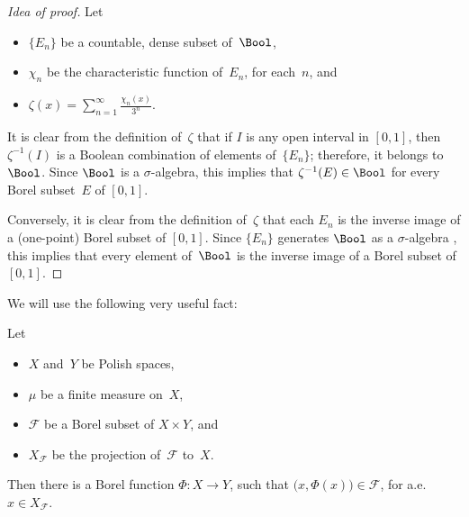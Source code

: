 \begin{proof}[Idea of proof]
Let 
	\begin{itemize}
	\item $\{E_n\}$ be a countable, dense subset of~$\Bool$,
	\item $\chi_n$ be the characteristic function of~$E_n$, for each~$n$,
	and
	\item $\displaystyle \zeta(x) = \sum_{n = 1}^\infty \frac{\chi_n(x)}{3^n}$.
	\end{itemize}

It is clear from the definition of~$\zeta$ that if $I$ is any open interval in $[0,1]$, then $\zeta^{-1}(I)$ is a Boolean combination of elements of~$\{E_n\}$; therefore, it belongs to~$\Bool$. Since $\Bool$ is a $\sigma$-algebra, this implies that $\zeta^{-1}(E) \in \Bool$ for every Borel subset~$E$ of $[0,1]$.

Conversely, it is clear from the definition of~$\zeta$ that each $E_n$ is the inverse image of a (one-point) Borel subset of $[0,1]$. Since $\{E_n\}$ generates $\Bool$ as a $\sigma$-algebra , this implies that every element of~$\Bool$ is the inverse image of a Borel subset of $[0,1]$.
\end{proof}

We will use the following very useful fact:

\begin{thm} \label{vonNeumannSelectionThm}
  Let
  \begin{itemize}
  \item $X$ and~$Y$ be Polish spaces,
  \item $\mu$ be a finite measure on~$X$,
  \item $\mathcal{F}$ be a Borel subset of $X \times Y$,
  and
  \item $X_{\mathcal{F}}$ be the projection of~$\mathcal{F}$ to~$X$.
  \end{itemize}
  Then there is a Borel function $\Phi \colon X \to Y$,
  such that $\bigl( x, \Phi(x) \bigr) \in \mathcal{F}$, for a.e.\ $x \in X_{\mathcal{F}}$.
  \end{thm}

